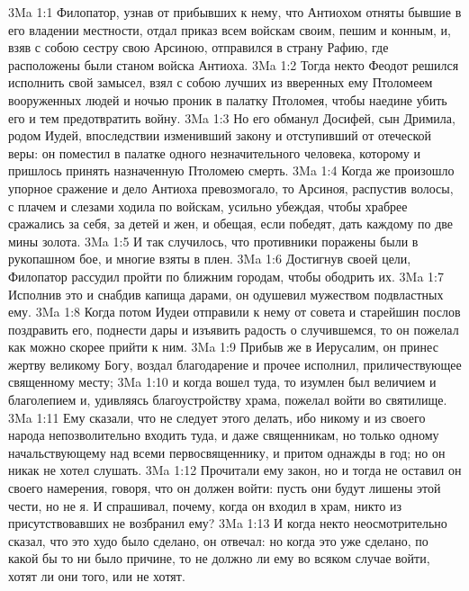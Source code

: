 \vs 3Ma 1:1 Филопатор, узнав от прибывших к нему, что Антиохом отняты бывшие в его владении местности, отдал приказ всем войскам своим, пешим и конным, и, взяв с собою сестру свою Арсиною, отправился в страну Рафию, где расположены были станом войска Антиоха.
\vs 3Ma 1:2 Тогда некто Феодот решился исполнить свой замысел, взял с собою лучших из вверенных ему Птоломеем вооруженных людей и ночью проник в палатку Птоломея, чтобы наедине убить его и тем предотвратить войну.
\vs 3Ma 1:3 Но его обманул Досифей, сын Дримила, родом Иудей, впоследствии изменивший закону и отступивший от отеческой веры: он поместил в палатке одного незначительного человека, которому и пришлось принять назначенную Птоломею смерть.
\vs 3Ma 1:4 Когда же произошло упорное сражение и дело Антиоха превозмогало, то Арсиноя, распустив волосы, с плачем и слезами ходила по войскам, усильно убеждая, чтобы храбрее сражались за себя, за детей и жен, и обещая, если победят, дать каждому по две мины золота.
\vs 3Ma 1:5 И так случилось, что противники поражены были в рукопашном бое, и многие взяты в плен.
\vs 3Ma 1:6 Достигнув своей цели, Филопатор рассудил пройти по ближним городам, чтобы ободрить их.
\vs 3Ma 1:7 Исполнив это и снабдив капища дарами, он одушевил мужеством подвластных ему.
\rsbpar\vs 3Ma 1:8 Когда потом Иудеи отправили к нему от совета и старейшин послов поздравить его, поднести дары и изъявить радость о случившемся, то он пожелал как можно скорее прийти к ним.
\vs 3Ma 1:9 Прибыв же в Иерусалим, он принес жертву великому Богу, воздал благодарение и прочее исполнил, приличествующее священному месту;
\vs 3Ma 1:10 и когда вошел туда, то изумлен был величием и благолепием и, удивляясь благоустройству храма, пожелал войти во святилище.
\vs 3Ma 1:11 Ему сказали, что не следует этого делать, ибо никому и из своего народа непозволительно входить туда, и даже священникам, но только одному начальствующему над всеми первосвященнику, и притом однажды в год; но он никак не хотел слушать.
\vs 3Ma 1:12 Прочитали ему закон, но и тогда не оставил он своего намерения, говоря, что он должен войти: пусть они будут лишены этой чести, но не я. И спрашивал, почему, когда он входил в храм, никто из присутствовавших не возбранил ему?
\vs 3Ma 1:13 И когда некто неосмотрительно сказал, что это худо было сделано, он отвечал: но когда это уже сделано, по какой бы то ни было причине, то не должно ли ему во всяком случае войти, хотят ли они того, или не хотят.
